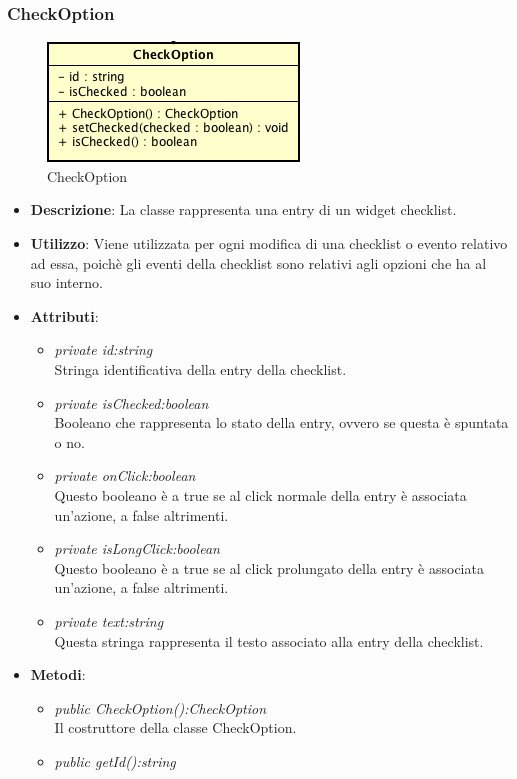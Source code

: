 \subsubsection{CheckOption}

\label{CheckOption}
\begin{figure}[ht]
	\centering
	\includegraphics[scale=0.5]{Sezioni/SottosezioniST/img/CheckOption.png}
	\caption{CheckOption}
\end{figure}

\begin{itemize}
\item \textbf{Descrizione}: La classe rappresenta una entry di un widget checklist.
\item \textbf{Utilizzo}: Viene utilizzata per ogni modifica di una checklist o evento relativo ad essa, poichè gli eventi della checklist sono relativi agli opzioni che ha al suo interno.
\item \textbf{Attributi}:
	\begin{itemize}
	\item \textit{private id:string}\\
	Stringa identificativa della entry della checklist.
	\item \textit{private isChecked:boolean}\\
	Booleano che rappresenta lo stato della entry, ovvero se questa è spuntata o no.
	\item \textit{private onClick:boolean}\\
	Questo booleano è a true se al click normale della entry è associata un'azione, a false altrimenti.
	\item \textit{private isLongClick:boolean}\\
	Questo booleano è a true se al click prolungato della entry è associata un'azione, a false altrimenti.
	\item \textit{private text:string}\\
	Questa stringa rappresenta il testo associato alla entry della checklist.
	\end{itemize}
\item \textbf{Metodi}:
	\begin{itemize}
	\item \textit{public CheckOption():CheckOption}\\
	Il costruttore della classe CheckOption.
	\item \textit{public getId():string}\\
	

\end{itemize}
\end{itemize}
